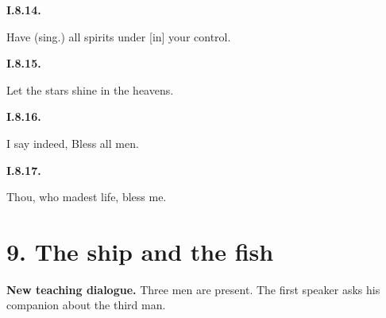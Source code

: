 \par\begin{minipage}{\linewidth}\raggedright
\textbf{I.8.14.}

Have (sing.) all spirits under [in] your control.

\end{minipage}\par\addvspace{4pt}

\par\begin{minipage}{\linewidth}\raggedright
\textbf{I.8.15.}

Let the stars shine in the heavens.

\end{minipage}\par\addvspace{4pt}

\par\begin{minipage}{\linewidth}\raggedright
\textbf{I.8.16.}

I say indeed, Bless all men.

\end{minipage}\par\addvspace{4pt}

\par\begin{minipage}{\linewidth}\raggedright
\textbf{I.8.17.}

Thou, who madest life, bless me.

\end{minipage}\par\addvspace{4pt}

\section*{9. The ship and the fish}

\textbf{New teaching dialogue.} Three men are present. The first speaker asks his companion about the third man.

